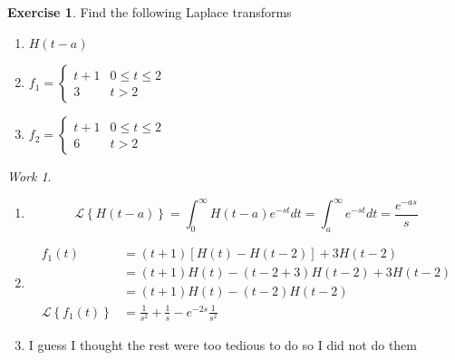 \documentclass{report}
\theoremstyle{definition}
\newtheorem{exercise}{Exercise}[chapter]
\theoremstyle{remark}
\newtheorem*{work}{Work}
\newcommand{\lapt}[1]{\mathscr{L}\left\{ #1\right\}}
\begin{document}
\begin{exercise}
    Find the following Laplace transforms
    \begin{enumerate}[label =(\alph*)]
        \item $H(t-a)$
        \item $\displaystyle{f_1 = \begin{cases}
            t+1 &0\leq t\leq 2\\ 3&t>2
        \end{cases}}$
        \item$\displaystyle{f_2 = \begin{cases}
            t+1&0\leq t \leq 2 \\ 6 &t>2
        \end{cases}}$
    \end{enumerate}
\end{exercise}
\begin{work}
\leavevmode
    \begin{enumerate}[label =(\alph*)]
        \item \begin{equation*}
            \lapt{H(t-a)} = \int^\infty_0H(t-a)e^{-st}dt = \int^\infty_ae^{-st}dt =\frac{e^{-as}}{s}
        \end{equation*}
        \item \begin{equation*}
            \begin{split}
                f_1(t) &= (t+1)\left[H(t) -H(t-2)\right] +3H(t-2) \\
                &=(t+1)H(t) -(t-2+3)H(t-2)+3H(t-2) \\
                &= (t+1)H(t)-(t-2)H(t-2) \\
                \lapt{f_1(t)}&=\frac{1}{s^2}+\frac{1}{s} -e^{-2s}\frac{1}{s^2}
            \end{split}
        \end{equation*}
        \item I guess I thought the rest were too tedious to do so I did not do them
    \end{enumerate}
\end{work}
\end{document}
